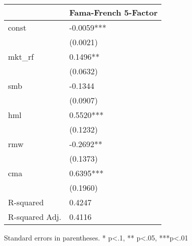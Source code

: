 \begin{table}
\caption{}
\label{}
\begin{center}
\begin{tabular}{ll}
\hline
               & Fama-French 5-Factor  \\
\hline
const          & -0.0059***            \\
               & (0.0021)              \\
mkt\_rf        & 0.1496**              \\
               & (0.0632)              \\
smb            & -0.1344               \\
               & (0.0907)              \\
hml            & 0.5520***             \\
               & (0.1232)              \\
rmw            & -0.2692**             \\
               & (0.1373)              \\
cma            & 0.6395***             \\
               & (0.1960)              \\
R-squared      & 0.4247                \\
R-squared Adj. & 0.4116                \\
\hline
\end{tabular}
\end{center}
\end{table}
\bigskip
Standard errors in parentheses. \newline 
* p<.1, ** p<.05, ***p<.01